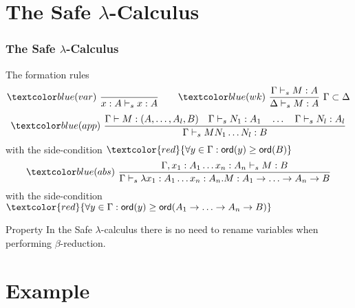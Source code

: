 \section{The Safe \texorpdfstring{$\lambda$}{Lambda}-Calculus}
\begin{frame} \frametitle{The Safe $\lambda$-Calculus}
\begin{block}{The formation rules}
$$ \rulename{var} \   \rulef{}{x : A\vdash_s x : A}
\qquad  \rulename{wk} \   \rulef{\Gamma \vdash_s M : A}{\Delta \vdash_s
M : A} \ \Gamma \subset \Delta$$
$$ \rulename{app} \  \rulef{\Gamma \vdash M : (A,\ldots,A_l,B)
                                        \quad \Gamma \vdash_s N_1 : A_1
                                        \quad \ldots \quad \Gamma \vdash_s N_l : A_l  }
                                   {\Gamma  \vdash_s M N_1 \ldots N_l : B}$$
\hfill with the side-condition $\textcolor{red}{\forall y \in \Gamma
: \ord{y} \geq \ord{B}}$
$$ \rulename{abs} \   \rulef{\Gamma, x_1:A_1 \ldots x_n : A_n \vdash_s M : B}
                                   {\Gamma  \vdash_s \lambda x_1:A_1 \ldots x_n : A_n . M : A_1 \rightarrow \ldots \rightarrow A_n \rightarrow B}$$
\hfill with the side-condition $\textcolor{red}{\forall y \in \Gamma
: \ord{y} \geq \ord{A_1 \rightarrow \ldots \rightarrow A_n
\rightarrow B}}$
\end{block}
\pause
\begin{block}{Property}
In the Safe $\lambda$-calculus there is no need to rename variables when
performing $\beta$-reduction.
\end{block}
\end{frame}


\section{Example}




